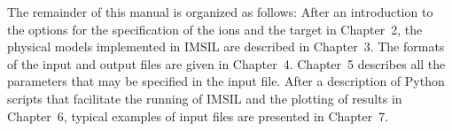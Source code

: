 The remainder of this manual is organized as follows: After an introduction to
the options for the specification of the ions and the target in Chapter~2, the
physical models implemented in IMSIL are described in Chapter~3. The formats of
the input and output files are given in Chapter~4. Chapter~5 describes all the
parameters that may be specified in the input file.  After a description of
Python scripts that facilitate the running of IMSIL and the plotting of results
in Chapter~6, typical examples of input files are presented in Chapter~7. 

